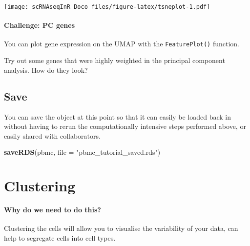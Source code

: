 \documentclass[
]{book}
\newenvironment{Shaded}{\begin{snugshade}}{\end{snugshade}}
\newcommand{\AttributeTok}[1]{\textcolor[rgb]{0.13,0.29,0.53}{#1}}
\newcommand{\FunctionTok}[1]{\textcolor[rgb]{0.13,0.29,0.53}{\textbf{#1}}}
\newcommand{\NormalTok}[1]{#1}
\newcommand{\StringTok}[1]{\textcolor[rgb]{0.31,0.60,0.02}{#1}}
\begin{document}
\texttt{[image: scRNAseqInR\_Doco\_files/figure-latex/tsneplot-1.pdf]}

\hypertarget{challenge-pc-genes}{%
\subsubsection*{Challenge: PC genes}\label{challenge-pc-genes}}

You can plot gene expression on the UMAP with the \texttt{FeaturePlot()} function.

Try out some genes that were highly weighted in the principal component analysis. How do they look?

\hypertarget{section-7}{%
\subsubsection*{}\label{section-7}}

\hypertarget{save}{%
\section{Save}\label{save}}

You can save the object at this point so that it can easily be loaded back in without having to rerun the computationally intensive steps performed above, or easily shared with collaborators.

\begin{Shaded}
\begin{Highlighting}[]
\FunctionTok{saveRDS}\NormalTok{(pbmc, }\AttributeTok{file =} \StringTok{"pbmc\_tutorial\_saved.rds"}\NormalTok{) }
\end{Highlighting}
\end{Shaded}

\hypertarget{clustering}{%
\chapter{Clustering}\label{clustering}}

\hypertarget{why-do-we-need-to-do-this-5}{%
\subsubsection*{Why do we need to do this?}\label{why-do-we-need-to-do-this-5}}

Clustering the cells will allow you to visualise the variability of your data, can help to segregate cells into cell types.
\end{document}
